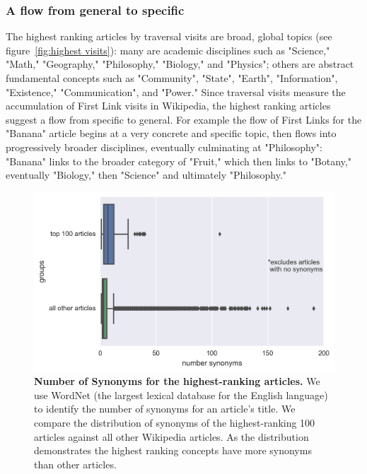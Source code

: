 \documentclass[pre,twocolumn,twoside,superscriptaddress,floatfix, aps, 10pt]{revtex4-1}
\begin{document}
\subsubsection{A flow from general to specific}

The highest ranking articles by traversal visits are 
broad, global topics
(see figure~\ref{fig:highest visits}):
many are academic disciplines such as "Science," "Math," 
"Geography," "Philosophy," "Biology," and "Physics"; others are abstract fundamental concepts such as 
"Community", "State", "Earth", "Information", 
"Existence," "Communication", and "Power."
Since traversal visits measure the accumulation of First Link visits in Wikipedia, 
the highest ranking articles suggest a flow from specific to general. 
For example the flow of First Links for the "Banana" article begins at a very concrete
and specific topic, then flows into progressively broader disciplines, eventually 
culminating at "Philosophy": "Banana" links to the broader category of "Fruit," which then links to 
"Botany," eventually "Biology," then "Science" and ultimately "Philosophy." 


\begin{figure}[tp!]
  \centering	
  \includegraphics[width=\columnwidth]{graphics/synonyms.png}
  \caption{
    \textbf{Number of Synonyms for the highest-ranking articles.}
    We use WordNet (the largest lexical database for the English language)
    to identify the number of synonyms for an article's title. We compare 
    the distribution of synonyms of the highest-ranking 100 articles
    against all other Wikipedia articles. As the distribution demonstrates
    the highest ranking concepts have more synonyms than other articles.
  }
  \label{fig:synonyms}
\end{figure}
\end{document}
